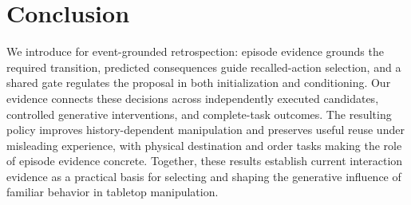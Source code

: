 \section{Conclusion}
\label{sec:conclusion}
We introduce \method{} for event-grounded retrospection: episode evidence grounds the required transition, predicted consequences guide recalled-action selection, and a shared gate regulates the proposal in both initialization and conditioning.
Our evidence connects these decisions across independently executed candidates, controlled generative interventions, and complete-task outcomes.
The resulting policy improves history-dependent manipulation and preserves useful reuse under misleading experience, with physical destination and order tasks making the role of episode evidence concrete.
Together, these results establish current interaction evidence as a practical basis for selecting and shaping the generative influence of familiar behavior in tabletop manipulation.
